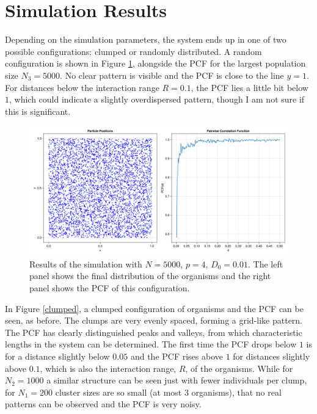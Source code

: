 \documentclass{article}
\begin{document}
\section{Simulation Results} \label{secres}
Depending on the simulation parameters, the system ends up in one of two possible configurations: clumped or randomly distributed.
A random configuration is shown in Figure \ref{random}, alongside the PCF for the largest population size $N_3=5000$. 
No clear pattern is visible and the PCF is close to the line $y=1$.
For distances below the interaction range $R=0.1$, the PCF lies a little bit below $1$, which could indicate a slightly overdispersed pattern, though I am not sure if this is significant.
\begin{figure}
    \includegraphics[width=0.9\linewidth]{img/rp156_N5000_D01_p4.png}
    \caption{Results of the simulation with $N=5000$, $p=4$, $D_0=0.01$. The left panel shows the final distribution of the organisms and the right panel shows the PCF of this configuration.}
    \label{random}
\end{figure}
In Figure \ref{clumped}, a clumped configuration of organisms and the PCF can be seen, as before.
The clumps are very evenly spaced, forming a grid-like pattern. 
The PCF has clearly distinguished peaks and valleys, from which characteristic lengths in the system can be determined.
The first time the PCF drops below $1$ is for a distance slightly below $0.05$ and the PCF rises above $1$ for distances slightly above $0.1$, which is also the interaction range, $R$, of the organisms.
While for $N_2=1000$ a similar structure can be seen just with fewer individuals per clump, for $N_1=200$ cluster sizes are so small (at most $3$ organisms), that no real patterns can be observed and the PCF is very noisy.
\end{document}
